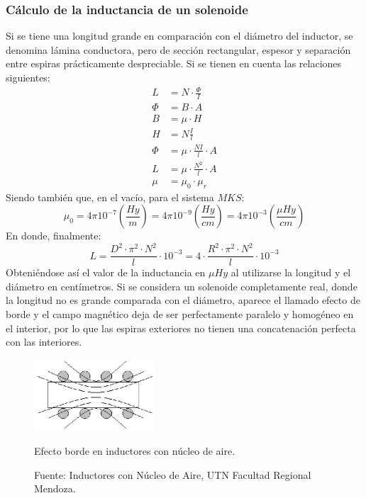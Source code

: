 \documentclass{article}
\begin{document}
\subsubsection{Cálculo de la inductancia de un solenoide}
Si se tiene una longitud grande en comparación con el diámetro del inductor, se denomina lámina conductora, pero de sección rectangular, espesor y separación entre espiras prácticamente despreciable.
Si se tienen en cuenta las relaciones siguientes:
\begin{align*}
    L &= N \cdot \frac{\Phi}{I} \\
    \Phi &= B \cdot A \\
    B &= \mu \cdot H \\
    H &= N \frac{I}{l} \\
    \Phi &= \mu \cdot \frac{NI}{l} \cdot A \\
    L &= \mu \cdot \frac{N^2}{l} \cdot A \\
    \mu &= \mu_0 \cdot \mu_r    
\end{align*}
\noindent Siendo también que, en el vacío, para el sistema $MKS$:
\begin{equation*}
    \mu_0 = 4\pi 10^{-7} \left( \frac{Hy}{m} \right) = 4 \pi 10^{-9} \left( \frac{Hy}{cm} \right) = 4\pi 10^{-3} \left( \frac{\mu Hy}{cm} \right)
\end{equation*}
\noindent En donde, finalmente:
\begin{equation*}
    L = \frac{D^2 \cdot \pi^2 \cdot N^2}{l} \cdot 10^{-3} = 4 \cdot \frac{R^2 \cdot \pi^2 \cdot N^2 }{l} \cdot 10^{-3}
\end{equation*}
\indent Obteniéndose así el valor de la inductancia en $\mu Hy$ al utilizarse la longitud y el diámetro en centímetros.
Si se considera un solenoide completamente real, donde la longitud no es grande comparada con el diámetro, aparece el llamado efecto de borde y el campo magnético deja de ser perfectamente paralelo y homogéneo en el interior, por lo que las espiras exteriores no tienen una concatenación perfecta con las interiores.
\begin{figure}[H]
\centering
\includegraphics[width=0.4\textwidth]{./img/figura9.png}
\caption{Efecto borde en inductores con núcleo de aire.}
\caption*{Fuente: Inductores con Núcleo de Aire, UTN Facultad Regional Mendoza.}
\label{fig:circuito9}
\end{figure}
\end{document}
